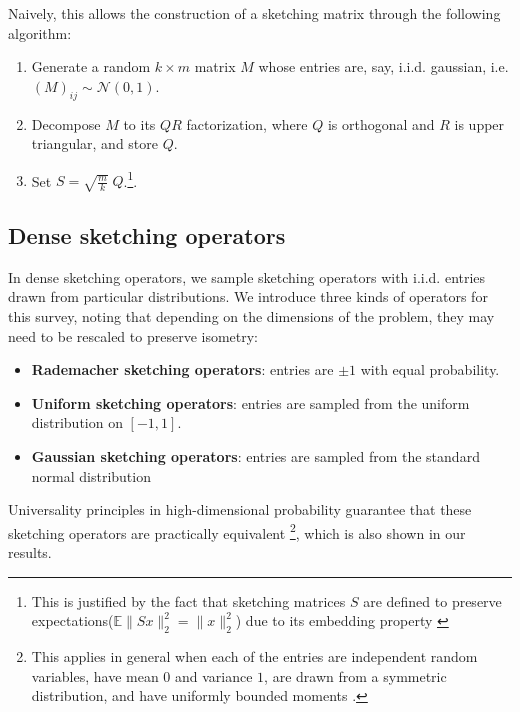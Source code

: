 \documentclass{article}
\newcommand{\bO}{\mathcal{O}}
\begin{document}
Naively, this allows the construction of a sketching matrix through the following algorithm:
\begin{enumerate}
    \item Generate a random $k \times m$ matrix $M$ whose entries are, say, i.i.d. gaussian, i.e. $(M)_{ij} \sim \mathcal{N}(0, 1)$.
    \item Decompose $M$ to its $QR$ factorization, where $Q$ is orthogonal and $R$ is upper triangular, and store $Q$.
    \item  Set $S = \sqrt{\frac mk} \; Q$.\footnote{This is justified by the fact that sketching matrices $S$ are defined to preserve expectations($\mathbb{E} \|Sx\|_2^2 = \|x\|_2^2$) due to its embedding property \cite{Nakatsukasa2024accuraterandomizedalgorithms}}.
\end{enumerate}




\subsection{Dense sketching operators}
In dense sketching operators, we sample sketching operators with i.i.d. entries drawn from particular distributions. We introduce three kinds of operators for this survey, noting that depending on the dimensions of the problem, they may need to be rescaled to preserve isometry: 
\begin{itemize}
   \item \textbf{Rademacher sketching operators}: entries are $\pm 1$ with equal probability.
    \item \textbf{Uniform sketching operators}: entries are sampled from the uniform distribution on $[-1, 1]$.
    \item \textbf{Gaussian sketching operators}: entries are sampled from the standard normal distribution
\end{itemize}

Universality principles in high-dimensional probability \cite{oymak2018universality} guarantee that these sketching operators are practically equivalent \footnote{This applies in general when each of the entries are independent random variables, have mean $0$ and variance $1$, are drawn from a symmetric distribution, and have uniformly bounded moments \cite{oymak2018universality}.}, which is also shown in our results. %
\end{document}
